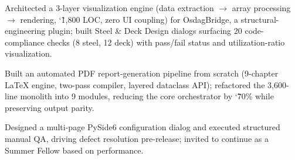 \begin{resumeList}
    \item Architected a 3-layer visualization engine (data extraction $\rightarrow$ array processing $\rightarrow$ rendering, \char`\~1,800 LOC, zero UI coupling) for OsdagBridge, a structural-engineering plugin; built Steel \& Deck Design dialogs surfacing 20 code-compliance checks (8 steel, 12 deck) with pass/fail status and utilization-ratio visualization.
    \item Built an automated PDF report-generation pipeline from scratch (9-chapter LaTeX engine, two-pass compiler, layered dataclass API); refactored the 3,600-line monolith into 9 modules, reducing the core orchestrator by \char`\~70\% while preserving output parity.
    \item Designed a multi-page PySide6 configuration dialog and executed structured manual QA, driving defect resolution pre-release; invited to continue as a Summer Fellow based on performance.
\end{resumeList}
